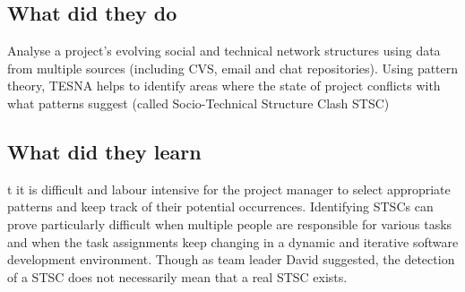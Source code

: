 \subsection{What did they do}

Analyse a project's evolving social and technical network structures using data from multiple sources (including CVS, email and chat repositories). Using pattern theory, TESNA helps to identify areas where the state of project conflicts with what patterns suggest (called Socio-Technical Structure Clash STSC)

\subsection{What did they learn}

t it is difficult and labour intensive for the project manager to select appropriate patterns and keep track of their potential occurrences. Identifying STSCs can prove particularly difficult when multiple people are responsible for various tasks and when the task assignments keep changing in a dynamic and iterative software development environment. Though as team leader David suggested, the detection of a STSC does not necessarily mean that a real STSC exists.
